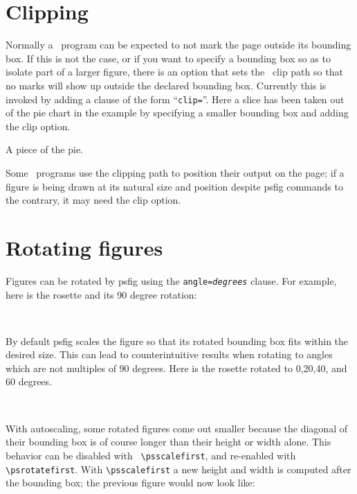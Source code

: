 \section{Clipping}
Normally a \Ps\ program can be expected to not mark the page 
outside its bounding box. If this is not the case, or if you
want to specify a bounding box so as to isolate part of a larger figure,
there is an option that sets the \Ps\ clip path so that
no marks will show up outside the declared bounding box. Currently
this is invoked by adding a clause of the form ``{\tt clip=}''.
Here a slice has been taken out of the pie chart in the example by
specifying a smaller bounding box and adding the clip option.
\par
\centerline{\protect{}}
\centerline{A piece of the pie.}
\vspace{.2in}
\par
Some \Ps\ programs use the clipping path to position their output on
the page; if a figure is being drawn at its natural size and position
despite psfig commands to the contrary, it may need the clip option.

\newpage
\section{Rotating figures}
Figures can be rotated by psfig using the {\tt angle={\it degrees}}
clause. For example, here is the rosette and its 90 degree rotation:

\centerline{\hbox{
}} 

By default psfig scales the figure so that its rotated bounding box
fits within the desired size. This can lead to counterintuitive results
when rotating to angles which are not multiples of 90 degrees. Here
is the rosette rotated to 0,20,40, and 60 degrees.

\centerline{\hbox{
}} 

With autoscaling, some rotated figures come out smaller because the
diagonal of their bounding box is of course longer than their height
or width alone.  This behavior can be disabled with {\tt
\verb+\+psscalefirst}, and re-enabled with {\tt
\verb+\+psrotatefirst}. With {\tt \verb+\+psscalefirst} a new
height and width is computed after the bounding box;
the previous figure would now look like:

